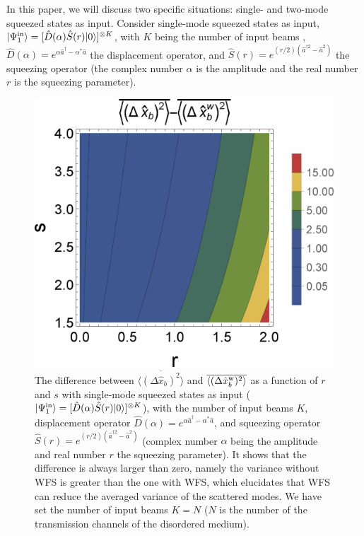 \documentclass[9pt,twocolumn,twoside]{osajnl}
\begin{document}
In this paper, we will discuss two specific situations: single- and two-mode squeezed states as input. Consider single-mode squeezed states as input, $| \Psi_1^{\rm{in}} \rangle = [\hat{D}(\alpha)\hat{S}(r)  |0\rangle]^{\otimes K}$, with $K$ being the number of input beams \cite{k}, $\hat{D}(\alpha) = e^{\alpha \hat{a}^{\dagger} - \alpha^{\ast} \hat{a}}$ the displacement operator, and $\hat{S}(r) = e^{ (r /2)(\hat{a}^{\dagger 2} - \hat{a}^{2}) }$ the squeezing operator (the complex number $\alpha$ is the amplitude and the real number $r$ is the squeezing parameter).


\begin{figure}[htbp]
\begin{center}
\includegraphics[width=.40\textwidth]{3Dsqz1_20190708.eps} {}
\end{center}
\caption{The difference between $\overline{\langle (\Delta \hat{x}_b)^2 \rangle}$ and $\overline{\langle (\Delta \hat{x}_b^{\rm{w}})^2 \rangle}$ as a function of $r$ and $s$ with single-mode squeezed states as input ($|\Psi^{\rm{in}}_1 \rangle = [\hat{D}(\alpha)\hat{S}(r)|0\rangle]^{\otimes K}$), with the number of input beams $K$, displacement operator $\hat{D}(\alpha) = e^{\alpha \hat{a}^{\dagger} - \alpha^{\ast} \hat{a}}$, and squeezing operator $\hat{S}(r) = e^{ (r /2)(\hat{a}^{\dagger 2} - \hat{a}^{2}) }$ (complex number $\alpha$ being the amplitude and real number $r$ the squeezing parameter). It shows that the difference is always larger than zero, namely the variance without WFS is greater than the one with WFS, which elucidates that WFS can reduce the averaged variance of the scattered modes. We have set the number of input beams $K=N$ ($N$ is the number of the transmission channels of the disordered medium).}
\label{3dsqz1}
\end{figure}
\end{document}
